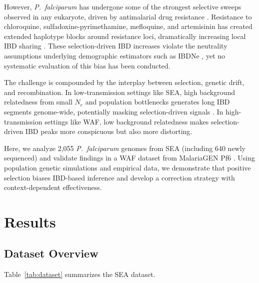 \documentclass[11pt]{article}
\begin{document}
However, \textit{P.~falciparum} has undergone some of the strongest selective sweeps observed in any eukaryote, driven by antimalarial drug resistance \citep{ariey2014molecular, miotto2015genetic}. Resistance to chloroquine, sulfadoxine-pyrimethamine, mefloquine, and artemisinin has created extended haplotype blocks around resistance loci, dramatically increasing local IBD sharing \citep{nair2007recurrent, hamilton2017evolution}. These selection-driven IBD increases violate the neutrality assumptions underlying demographic estimators such as IBDNe \citep{browning2015ibdne}, yet no systematic evaluation of this bias has been conducted.

The challenge is compounded by the interplay between selection, genetic drift, and recombination. In low-transmission settings like SEA, high background relatedness from small $N_e$ and population bottlenecks generates long IBD segments genome-wide, potentially masking selection-driven signals \citep{nkhoma2013population}. In high-transmission settings like WAF, low background relatedness makes selection-driven IBD peaks more conspicuous but also more distorting.

Here, we analyze 2,055 \textit{P.~falciparum} genomes from SEA (including 640 newly sequenced) and validate findings in a WAF dataset from MalariaGEN Pf6 \citep{malariagen2021pf7}. Using population genetic simulations and empirical data, we demonstrate that positive selection biases IBD-based inference and develop a correction strategy with context-dependent effectiveness.

\section{Results}

\subsection{Dataset Overview}

Table~\ref{tab:dataset} summarizes the SEA dataset.
\end{document}
